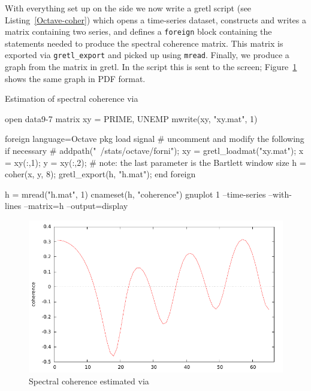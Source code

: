 With everything set up on the  side we now write a gretl
script (see Listing~\ref{Octave-coher}) which opens a time-series
dataset, constructs and writes a matrix containing two series, and
defines a \texttt{foreign} block containing the 
statements needed to produce the spectral coherence matrix. This
matrix is exported via \verb|gretl_export| and picked up using
\texttt{mread}. Finally, we produce a graph from the matrix in gretl.
In the script this is sent to the screen; Figure~\ref{fig:coherence}
shows the same graph in PDF format.

\begin{script}[htbp]
  \caption{Estimation of spectral coherence via }
  \label{Octave-coher}
\begin{scode}
open data9-7
matrix xy = { PRIME, UNEMP }
mwrite(xy, "xy.mat", 1)

foreign language=Octave
 pkg load signal
 # uncomment and modify the following if necessary
 # addpath("~/stats/octave/forni");
 xy = gretl_loadmat("xy.mat");
 x = xy(:,1);
 y = xy(:,2);
 # note: the last parameter is the Bartlett window size
 h = coher(x, y, 8);
 gretl_export(h, "h.mat");
end foreign

h = mread("h.mat", 1)
cnameset(h, "coherence")
gnuplot 1 --time-series --with-lines --matrix=h --output=display
\end{scode}
\end{script}

\begin{figure}[htbp]
  \centering
  \includegraphics{figures/coherence}
  \caption{Spectral coherence estimated via }
  \label{fig:coherence}
\end{figure}


